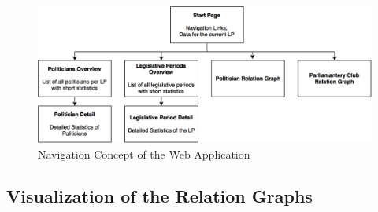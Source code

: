 \begin{figure}
	\centering
	\includegraphics[width=\textwidth]{imgs/navigation_concept}
	\caption{Navigation Concept of the Web Application}
	\label{fig:navigation_concept}
\end{figure}


\subsection{Visualization of the Relation Graphs}


